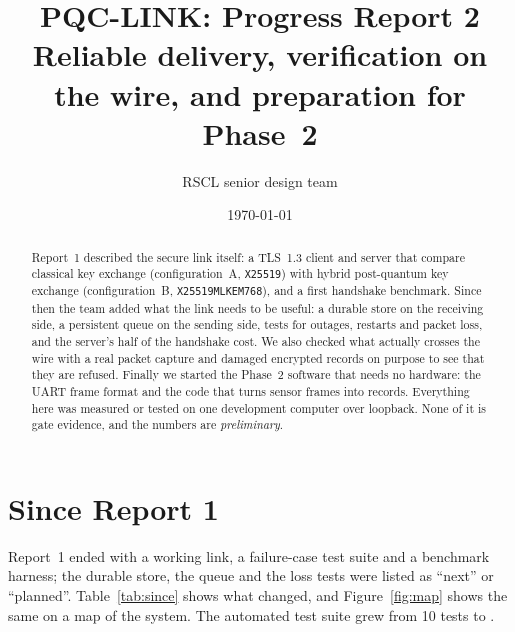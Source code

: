 \documentclass[11pt,a4paper]{article}
\title{\textbf{PQC-LINK: Progress Report 2}\\[2pt]
       \large Reliable delivery, verification on the wire, and preparation for Phase~2}
\author{RSCL senior design team}
\date{\today}
\newcommand{\prog}[1]{\texttt{#1}}
\begin{document}
\maketitle

\begin{abstract}
\noindent Report~1 described the secure link itself: a TLS~1.3 client and server that compare
classical key exchange (configuration~A, \prog{X25519}) with hybrid post-quantum key exchange
(configuration~B, \prog{X25519MLKEM768}), and a first handshake benchmark. Since then the team
added what the link needs to be useful: a durable store on the receiving side, a persistent queue
on the sending side, tests for outages, restarts and packet loss, and the server's half of the
handshake cost. We also checked what actually crosses the wire with a real packet capture and
damaged encrypted records on purpose to see that they are refused. Finally we started the
Phase~2 software that needs no hardware: the UART frame format and the code that turns sensor
frames into records. Everything here was measured or tested on one development computer over
loopback. None of it is gate evidence, and the numbers are \emph{preliminary}.
\end{abstract}

\section{Since Report 1}

Report~1 ended with a working link, a failure-case test suite and a benchmark harness; the
durable store, the queue and the loss tests were listed as ``next'' or ``planned''.
Table~\ref{tab:since} shows what changed, and Figure~\ref{fig:map} shows the same on a map of the
system. The automated test suite grew from 10 tests to \NTests{}.
\end{document}
